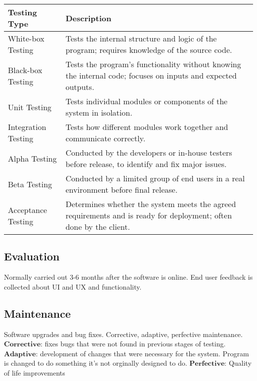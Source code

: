 \documentclass{article}
\theoremstyle{mytheoremstyle}
\theoremstyle{mytheoremstyle}
\theoremstyle{myproblemstyle}
\begin{document}
    \begin{center}
        \begin{tabular}{|l|p{8cm}|}
        \hline
        \textbf{Testing Type} & \textbf{Description} \\
        \hline
        White-box Testing & Tests the internal structure and logic of the program; requires knowledge of the source code. \\
        \hline
        Black-box Testing & Tests the program’s functionality without knowing the internal code; focuses on inputs and expected outputs. \\
        \hline
        Unit Testing & Tests individual modules or components of the system in isolation. \\
        \hline
        Integration Testing & Tests how different modules work together and communicate correctly. \\
        \hline
        Alpha Testing & Conducted by the developers or in-house testers before release, to identify and fix major issues. \\
        \hline
        Beta Testing & Conducted by a limited group of end users in a real environment before final release. \\
        \hline
        Acceptance Testing & Determines whether the system meets the agreed requirements and is ready for deployment; often done by the client. \\
        \hline
        \end{tabular}
    \end{center}

    \subsection{Evaluation}
    Normally carried out 3-6 months after the software is online. End user feedback is collected about UI and UX and functionality.

    \subsection{Maintenance}
    Software upgrades and bug fixes. Corrective, adaptive, perfective maintenance. $\textbf{Corrective}$: fixes bugs that were not found in previous stages of testing. $\textbf{Adaptive}$: development of changes that were necessary for the system. Program is changed to do something it's not orginally designed to do. $\textbf{Perfective}$: Quality of life improvements
\end{document}
